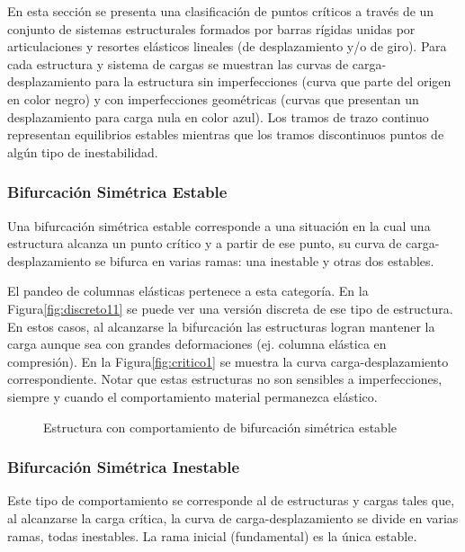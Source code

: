 En esta sección se presenta una clasificación de puntos críticos a través de un conjunto de sistemas estructurales formados por barras rígidas unidas por articulaciones y resortes elásticos lineales (de desplazamiento y/o de giro). Para cada estructura y sistema de cargas se muestran las curvas de carga-desplazamiento para la estructura sin imperfecciones (curva que parte del origen en color negro) y con imperfecciones geométricas (curvas que presentan un desplazamiento para carga nula en color azul). Los tramos de trazo continuo representan equilibrios estables mientras que los tramos discontinuos puntos de algún tipo de inestabilidad.

\subsubsection{Bifurcación Simétrica Estable}

Una bifurcación simétrica estable corresponde a una situación en la cual una estructura alcanza un punto crítico y a partir de ese punto, su curva de carga-desplazamiento se bifurca en varias ramas: una inestable y otras dos estables.

El pandeo de columnas elásticas pertenece a esta categoría. En la Figura\autoref{fig:discreto11} se puede ver una versión discreta de ese tipo de estructura. En estos casos, al alcanzarse la bifurcación las estructuras logran mantener la carga aunque sea con grandes deformaciones (ej. columna elástica en compresión). En la Figura\autoref{fig:critico1} se muestra la curva carga-desplazamiento correspondiente. Notar que estas estructuras no son sensibles a imperfecciones, siempre y cuando el comportamiento material permanezca elástico.
\begin{figure}[htb]
	\centering
{}
\hspace{1em}
\caption{Estructura con comportamiento de bifurcación simétrica estable}
	\label{fig:simetrica1}
\end{figure}

\subsubsection{Bifurcación Simétrica Inestable}

Este tipo de comportamiento se corresponde al de estructuras y cargas tales que, al alcanzarse la carga crítica, la curva de carga-desplazamiento se divide en varias ramas, todas inestables. La rama inicial (fundamental) es la única estable.

